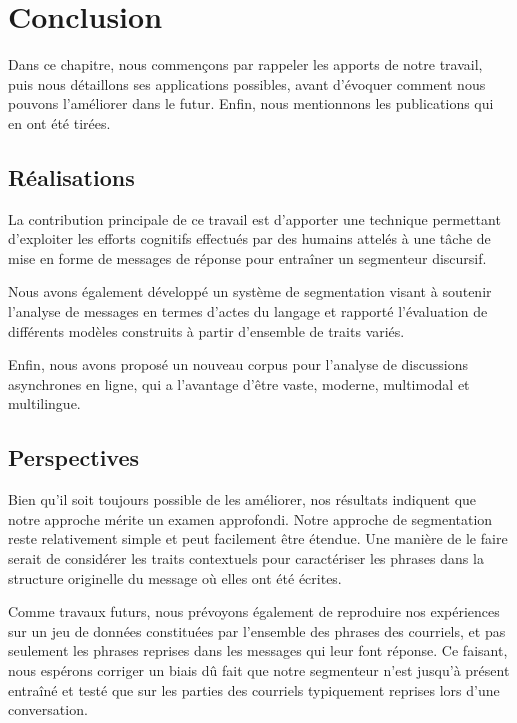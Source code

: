 
\chapter{Conclusion}

\label{ch:conclusions}

Dans ce chapitre, nous commençons par rappeler les apports de notre travail, puis nous détaillons ses applications possibles, avant d'évoquer comment nous pouvons l'améliorer dans le futur. Enfin, nous mentionnons les publications qui en ont été tirées.

\section{Réalisations}

La contribution principale de ce travail est d'apporter une technique permettant d'exploiter les efforts cognitifs effectués par des humains attelés à une tâche de mise en forme de messages de réponse pour entraîner un segmenteur discursif.

Nous avons également développé un système de segmentation visant à soutenir l'analyse de messages en termes d'actes du langage et rapporté l'évaluation de différents modèles construits à partir d'ensemble de traits variés.

Enfin, nous avons proposé un nouveau corpus pour l'analyse de discussions asynchrones en ligne, qui a l'avantage d'être vaste, moderne, multimodal et multilingue.

\section{Perspectives}

Bien qu'il soit toujours possible de les améliorer, nos résultats indiquent que notre approche mérite un examen approfondi. Notre approche de segmentation reste relativement simple et peut facilement être étendue. Une manière de le faire serait de considérer les traits contextuels pour caractériser les phrases dans la structure originelle du message où elles ont été écrites.

Comme travaux futurs, nous prévoyons également de reproduire nos expériences sur un jeu de données constituées par l'ensemble des phrases des courriels, et pas seulement les phrases reprises dans les messages qui leur font réponse. Ce faisant, nous espérons corriger un biais dû fait que notre segmenteur n'est jusqu'à présent entraîné et testé que sur les parties des courriels typiquement reprises lors d'une conversation.

